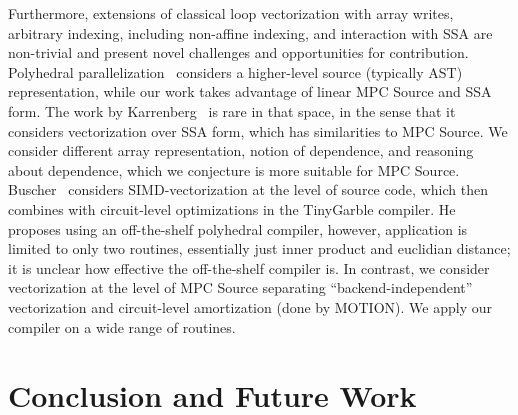 \documentclass[sigconf, screen, natbib=false, dvipsnames, table]{acmart}
\theoremstyle{definition}
\begin{document}
Furthermore, extensions of classical loop vectorization with array writes, arbitrary indexing, including non-affine indexing, and interaction with SSA are non-trivial 
and present novel challenges and opportunities for contribution. Polyhedral parallelization~\cite{Benabderrahmane:2010} considers a higher-level source (typically AST) 
representation, while our work takes advantage of linear MPC Source and SSA form. The work by Karrenberg~\cite{Karrenberg:2015} is rare in that space, in the sense that it considers 
vectorization over SSA form, which has similarities to MPC Source. We consider different array representation, notion of dependence, and reasoning 
about dependence, which we conjecture is more suitable for MPC Source. Buscher~\cite{Buscher:2018} considers SIMD-vectorization 
at the level of source code, which then combines with circuit-level optimizations in the TinyGarble compiler. 
He proposes using an off-the-shelf polyhedral compiler, however, application is limited to only two routines, 
essentially just inner product and euclidian distance; it is unclear how effective the off-the-shelf compiler is. 
In contrast, we consider vectorization at the level of MPC Source separating ``backend-independent'' vectorization
and circuit-level amortization (done by MOTION). We apply our compiler on a wide range of routines.

%
%

\section{Conclusion and Future Work}
\label{sec:conclusion}
%




%
%



\end{document}
